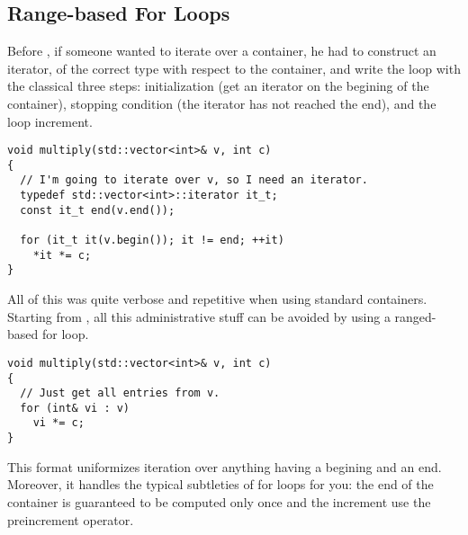 \subsection{Range-based For Loops}
\label{range-based-for-loops}

Before , if someone wanted to iterate over a container, he had
to construct an iterator, of the correct type with respect to the
container, and write the loop with the classical three steps:
initialization (get an iterator on the begining of the container),
stopping condition (the iterator has not reached the end), and the
loop increment.

\begin{lstlisting}
void multiply(std::vector<int>& v, int c)
{
  // I'm going to iterate over v, so I need an iterator.
  typedef std::vector<int>::iterator it_t;
  const it_t end(v.end());

  for (it_t it(v.begin()); it != end; ++it)
    *it *= c;
}
\end{lstlisting}

All of this was quite verbose and repetitive when using standard
containers. Starting from , all this administrative stuff can be
avoided by using a ranged-based for loop.

\begin{lstlisting}
void multiply(std::vector<int>& v, int c)
{
  // Just get all entries from v.
  for (int& vi : v)
    vi *= c;
}
\end{lstlisting}

This format uniformizes iteration over anything having a begining and
an end. Moreover, it handles the typical subtleties of for loops for
you: the end of the container is guaranteed to be computed only once
and the increment use the preincrement operator.
